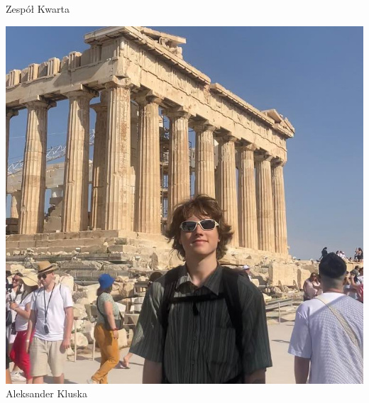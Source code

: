 \begin{frame}[t]{Zespół Kwarta}
\begin{minipage}{0.22\linewidth}
\includegraphics[width=\linewidth]{img/AK}\\
\scriptsize Aleksander Kluska \\
\scriptsize {}
\end{minipage}

\vspace{1.5em}\pause


\end{frame}
